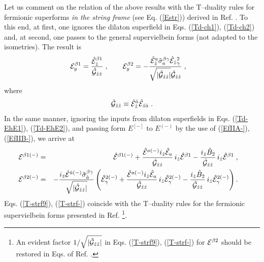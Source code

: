 \documentclass[a4paper,11pt]{article}
\begin{document}
Let us comment on the relation of the above results with the 
T--duality rules for fermionic superforms 
{\sl in the string frame} (see Eq. (\ref{Estr})) derived in Ref. \cite{kulik}. 
To this end, at first, one ignores the  dilaton superfield in 
Eqs. (\ref{Td-ch1}), (\ref{Td-ch2}) 
and, at second, one passes to the general  supervielbein forms 
(not adapted to the isometries). The result is 
\begin{eqnarray}\label{T-strf9}
{\cal E}_y^{\beta 1} = {\hat{{\cal E}}_{\hat{z}}^{{\beta}1}\over 
\hat{{\cal G}}_{\hat{z}\hat{z}}}\; , \qquad 
{\cal E}_y^{\beta 2} = - 
{\hat{{\cal E}}_{\hat{z}}^{{a}}\tilde{\sigma}_a^{\beta\gamma}
\hat{{\cal E}}_{\hat{z}}{}_{\gamma}^{2}\over 
\sqrt{|\hat{{\cal G}}_{\hat{z}\hat{z}}|}
\hat{{\cal G}}_{\hat{z}\hat{z}}}\; , \quad 
\end{eqnarray} 
where 
\begin{eqnarray}\label{calG}
\hat{{\cal G}}_{\hat{z}\hat{z}}\equiv \hat{{\cal E}}_{\hat{z}}^{\hat{a}}
\hat{{\cal E}}_{\hat{z}\hat{a}}\; .
\end{eqnarray}
In the same manner, ignoring the inputs from dilaton superfields in 
Eqs. (\ref{Td-EhE1}), (\ref{Td-EhE2}), and passing form $E^{[-]}$ to 
$E^{(-)}$ by the use of (\ref{EfIIA-}), (\ref{EfIIB-}), we arrive at 
\begin{eqnarray}\label{T-strf-}
{\cal E}^{\beta 1(-)} &=& \hat{{\cal E}}^{\beta 1(-)}
+  {\hat{{\cal E}}^{a(-)} i_{\hat{z}}\hat{{\cal E}}_a 
\over \hat{{\cal G}}_{\hat{z}\hat{z}} }
\, i_{\hat{z}} \hat{{\cal E}}^{{\beta}1} -  
{i_{\hat{z}} \hat{B}_2 \over \hat{{\cal G}}_{\hat{z}\hat{z}}}
\, i_{\hat{z}} \hat{{\cal E}}^{{\beta}1}
\; , \quad \nonumber \\ 
{\cal E}^{\beta 2(-)} &=& -  { i_{\hat{z}} \hat{{\cal E}}^{\hat{a}(-)} 
\tilde{\sigma}_{\hat{a}}^{\beta\gamma} \over 
\sqrt{|\hat{{\cal G}}_{\hat{z}\hat{z}}|}}
\left(\hat{{\cal E}}_{\gamma}^{2(-)} + 
{\hat{{\cal E}}^{a(-)} i_{\hat{z}}\hat{{\cal E}}_a 
\over \hat{{\cal G}}_{\hat{z}\hat{z}} } \, 
i_{\hat{z}}\hat{{\cal E}}_{\gamma}^{2(-)}
- {i_{\hat{z}} \hat{B}_2 \over \hat{{\cal G}}_{\hat{z}\hat{z}}} 
\, i_{\hat{z}}\hat{{\cal E}}_{\gamma}^{2(-)}\right) . \quad 
\end{eqnarray} 
Eqs. (\ref{T-strf9}), (\ref{T-strf-}) coincide with the T--duality rules 
for the fermionic supervielbein forms presented in Ref. 
\cite{kulik}\footnote{An evident factor  
$1/\sqrt{|\hat{{\cal G}}_{\hat{z}\hat{z}}|}$ 
in Eqs. (\ref{T-strf9}), (\ref{T-strf-}) for ${\cal E}^{\beta 2}$ 
should be restored in Eqs. of Ref. \cite{kulik}.}.  
\end{document}
